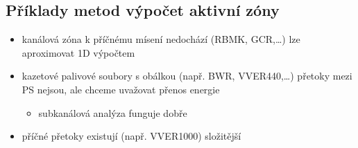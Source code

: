 \documentclass[letterpaper,10pt,czech]{sphinxmanual}
\begin{document}
\subsection{Příklady metod \textendash{} výpočet aktivní zóny}
\label{\detokenize{prednaska_19092022:priklady-metod-vypocet-aktivni-zony}}\begin{itemize}
\item {} 
\sphinxAtStartPar
kanálová zóna \textendash{} k příčnému mísení nedochází (RBMK, GCR,…) \sphinxhyphen{} lze aproximovat 1D výpočtem

\item {} 
\sphinxAtStartPar
kazetové palivové soubory s obálkou (např. BWR, VVER\sphinxhyphen{}440,…) \sphinxhyphen{} přetoky mezi PS nejsou, ale chceme uvažovat přenos energie
\begin{itemize}
\item {} 
\sphinxAtStartPar
subkanálová analýza funguje dobře

\end{itemize}

\item {} 
\sphinxAtStartPar
příčné přetoky existují (např. VVER\sphinxhyphen{}1000) \sphinxhyphen{} složitější

\end{itemize}
\end{document}
